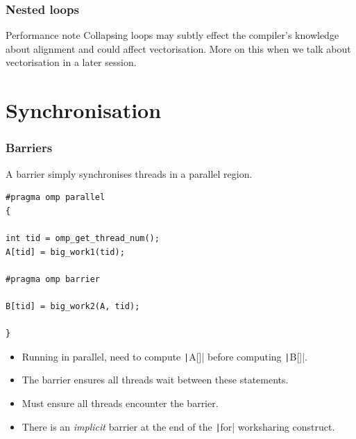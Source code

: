 \documentclass[aspectratio=169]{beamer}
\begin{document}
\begin{frame}
\frametitle{Nested loops}
\begin{block}{Performance note}
Collapsing loops may subtly effect the compiler's knowledge about alignment and could affect vectorisation.
More on this when we talk about vectorisation in a later session.
\end{block}

\end{frame}


\section{Synchronisation}
\begin{frame}[fragile]
\frametitle{Barriers}
A barrier simply synchronises threads in a parallel region.

\begin{verbatim}
#pragma omp parallel
{

int tid = omp_get_thread_num();
A[tid] = big_work1(tid);

#pragma omp barrier

B[tid] = big_work2(A, tid);

}
\end{verbatim}

\begin{itemize}
  \item Running in parallel, need to compute \texttt|A[]| before computing \texttt|B[]|.
  \item The barrier ensures all threads wait between these statements.
  \item Must ensure all threads encounter the barrier.
  \item There is an \emph{implicit} barrier at the end of the \texttt|for| worksharing construct.
\end{itemize}

\end{frame}
\end{document}
